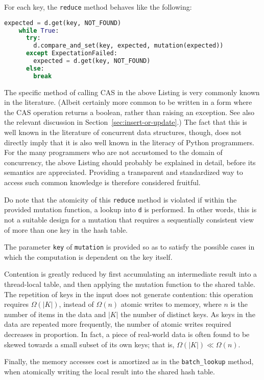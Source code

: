 For each key, the \texttt{reduce} method behaves like the following:
\begin{lstlisting}[caption={A common pattern when using CAS instructions.}, label={lst:aggregate}, language=Python]
    expected = d.get(key, NOT_FOUND)
    while True:
      try:
        d.compare_and_set(key, expected, mutation(expected))
      except ExpectationFailed:
        expected = d.get(key, NOT_FOUND)
      else:
        break
\end{lstlisting}

The specific method of calling CAS in the above Listing is very commonly known in the literature.
(Albeit certainly more common to be written in a form where the CAS operation returns a boolean, rather than raising an exception.
See also the relevant discussion in Section~\ref{sec:insert-or-update}.)
The fact that this is well known in the literature of concurrent data structures, though, does not directly imply that it is also well known in the literacy of Python programmers.
For the many programmers who are not accustomed to the domain of concurrency, the above Listing should probably be explained in detail, before its semantics are appreciated.
Providing a transparent and standardized way to access such common knowledge is therefore considered fruitful.

Do note that the atomicity of this \texttt{reduce} method is violated if within the provided mutation function, a lookup into \texttt{d} is performed.
In other words, this is not a suitable design for a mutation that requires a sequentially consistent view of more than one key in the hash table.

The parameter \texttt{key} of \texttt{mutation} is provided so as to satisfy the possible cases in which the computation is dependent on the key itself.

Contention is greatly reduced by first accumulating an intermediate result into a thread-local table, and then applying the mutation function to the shared table.
The repetition of keys in the input does not generate contention: this operation requires $\Omega(|K|)$, instead of $\Omega(n)$ atomic writes to memory, where $n$ is the number of items in the data and $|K|$ the number of distinct keys.
As keys in the data are repeated more frequently, the number of atomic writes required decreases in proportion.
In fact, a piece of real-world data is often found to be skewed towards a small subset of its own keys; that is, $\Omega(|K|) \ll \Omega(n)$.

Finally, the memory accesses cost is amortized as in the \texttt{{batch\_lookup}} method, when atomically writing the local result into the shared hash table.

